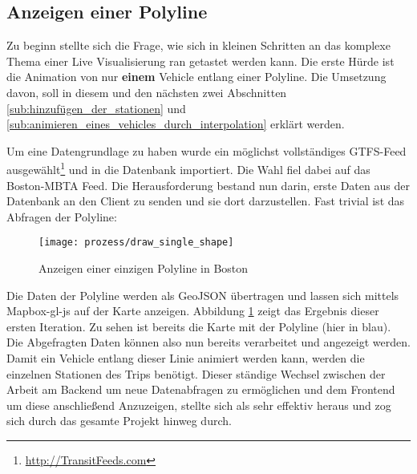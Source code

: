 \subsection{Anzeigen einer Polyline}
\label{sub:anzeigen_einer_polyline}
  Zu beginn stellte sich die Frage, wie sich in kleinen Schritten an das komplexe Thema einer Live Visualisierung ran getastet werden kann. Die erste Hürde ist die Animation von nur \textbf{einem} Vehicle entlang einer Polyline. Die Umsetzung davon, soll in diesem und den nächsten zwei Abschnitten \ref{sub:hinzufügen_der_stationen} und \ref{sub:animieren_eines_vehicles_durch_interpolation} erklärt werden.

  Um eine Datengrundlage zu haben wurde ein möglichst vollständiges GTFS-Feed  ausgewählt\footnote{\url{http://TransitFeeds.com}} und in die Datenbank importiert. Die Wahl fiel dabei auf das Boston-MBTA Feed. Die Herausforderung bestand nun darin, erste Daten aus der Datenbank an den Client zu senden und sie dort darzustellen. Fast trivial ist das Abfragen der Polyline:

  \colorbox{lightGrey}{\texttt{}}

  \begin{figure}[htbp]
    \begin{center}
      \texttt{[image: prozess/draw\_single\_shape]}
      \caption{Anzeigen einer einzigen Polyline in Boston}
      \label{fig:prozess/draw_single_shape}
    \end{center}
  \end{figure}
  
  Die Daten der Polyline werden als GeoJSON übertragen und lassen sich mittels Mapbox-gl-js auf der Karte anzeigen. Abbildung \ref{fig:prozess/draw_single_shape} zeigt das Ergebnis dieser ersten Iteration. Zu sehen ist bereits die Karte mit der Polyline (hier in blau). Die Abgefragten Daten können also nun bereits verarbeitet und angezeigt werden. Damit ein Vehicle entlang dieser Linie animiert werden kann, werden die einzelnen Stationen des Trips benötigt.
  Dieser ständige Wechsel zwischen der Arbeit am Backend um neue Datenabfragen zu ermöglichen und dem Frontend um diese anschließend Anzuzeigen, stellte sich als sehr effektiv heraus und zog sich durch das gesamte Projekt hinweg durch.
